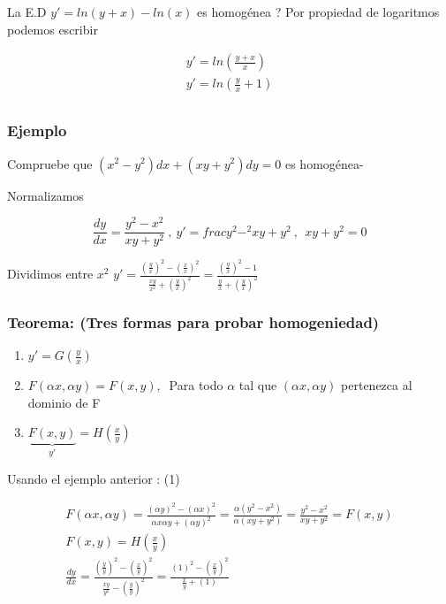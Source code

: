 \documentclass{article}
\begin{document}
La E.D $y' =ln (y+x) - ln(x) $ es homogénea ?
Por propiedad de logaritmos podemos escribir

\begin{eqnarray}
 \nonumber y' = ln \left( \frac{y+x}{x} \right) \\
 \nonumber y' = ln \left( \frac{y}{x} + 1 \right)\\
\end{eqnarray}

\subsubsection{Ejemplo}
Compruebe que $\left( x^2 - y^2 \right)dx+\left(xy+y^2\right)dy = 0$ es homogénea-


Normalizamos 


\begin{equation}
\frac{dy}{dx} = \frac{y^2-x^2}{xy+y^2} \  , \ y' = frac{y^2-^2}{xy+y^2} \ , \ \ xy+y^2 = 0
\end{equation}

Dividimos entre $x^2$  $y' = \frac{\left(\frac{y}{x} \right)^2 - \left( \frac{x}{x} \right)^2 }{\frac{xy}{x^2} + \left( \frac{y}{x} \right)^2} = \frac{\left( \frac{y}{x} \right)^2 -1}{\frac{y}{x}+ \left( \frac{y}{x} \right)^2}$

\subsubsection{Teorema: (Tres formas para probar homogeniedad)}

\begin{enumerate}
\item $y' = G \left( \frac{y}{x} \right)$
\item $ F \left( \alpha x ,\alpha y \right) = F \left( x,y \right), \ $ Para todo $\alpha$ tal que $\left( \alpha x, \alpha y \right)$ pertenezca al dominio de F
\item $ \underbrace{F (x,y)}_{y'} = H \left( \frac{x}{y} \right) $ 
\end{enumerate}

Usando el ejemplo anterior : (1)

\begin{eqnarray}
\nonumber F \left( \alpha x ,\alpha y \right) = \frac{(\alpha y)^2-(\alpha x)^2}{\alpha x \alpha y+ (\alpha y)^2} = \frac{\alpha \left( y^2-x^2 \right)}{\alpha \left( xy+y^2 \right)} = \frac{y^2-x^2}{xy+y^2} = F(x,y) \\
\nonumber F(x,y) = H \left( \frac{x}{y} \right) \\
\nonumber \frac{dy}{dx} = \frac{\left(\frac{y}{y} \right)^2 - \left( \frac{x}{y} \right)^2 }{\frac{xy}{y^2} - \left( \frac{y}{y} \right)^2} =  \frac{\left( 1 \right)^2 - \left( \frac{x}{y} \right)^2 }{\frac{x}{y} + \left( 1 \right)}  \\
\end{eqnarray}
\end{document}
